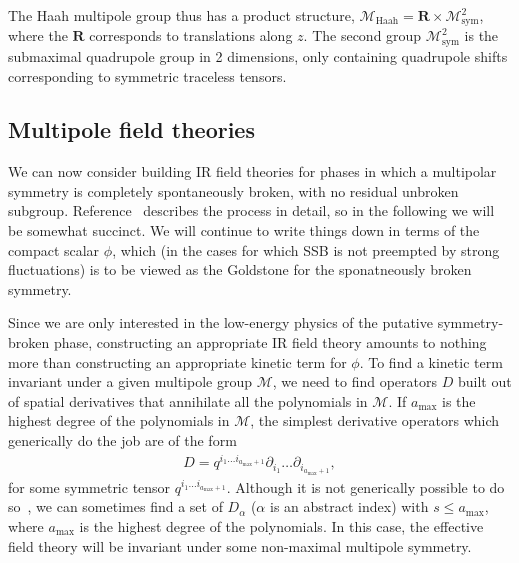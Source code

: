 \documentclass[pra,aps,twocolumn, amsfonts,amsmath,amssymb,nofootinbib,superscriptaddress]{revtex4-2}
\begin{document}
The Haah multipole group thus has a product structure, $\mathcal{M}_\text{Haah} = \mathbf{R} \times \mathcal{M}^2_\text{sym}$, where the $\mathbf{R}$ corresponds to translations along $z$. The second group $\mathcal{M}^2_\text{sym}$ is the submaximal quadrupole group in 2 dimensions, only containing quadrupole shifts corresponding to symmetric traceless tensors.

\subsection{Multipole field theories} \label{sub:field}

We can now consider building IR field theories for phases in which a multipolar symmetry is completely spontaneously broken, with no residual unbroken subgroup. Reference~\cite{Gromov2019} describes the process in detail, so in the following we will be somewhat succinct. 
We will continue to write things down in terms of the compact scalar $\phi$, which (in the cases for which SSB is not preempted by strong fluctuations) is to be viewed as the Goldstone for the sponatneously broken symmetry. 

Since we are only interested in the low-energy physics of the putative symmetry-broken phase, constructing an appropriate IR field theory amounts to nothing more than constructing an appropriate kinetic term for $\phi$. 
To find a kinetic term invariant under a given multipole group $\mathcal{M}$, we need to find operators $D$ built out of spatial derivatives that annihilate all the polynomials in $\mathcal{M}$. If $a_\text{max}$ is the highest degree of the polynomials in $\mathcal{M}$, the simplest derivative operators which generically do the job are of the form  
\begin{align}
D = q^{i_1\dots i_{a_\text{max}+1}}\partial_{i_1}\dots \partial_{i_{a_\text{max}+1}},
\end{align}
for some symmetric tensor $q^{i_1\dots i_{a_\text{max}+1}}$. Although it is not generically possible to do so~\cite{Gromov2019}, we can sometimes find a set of $D_\alpha$ ($\alpha$ is an abstract index) with $s\le a_{\text{max}}$, where $a_\text{max}$ is the highest degree of the polynomials. In this case, the effective field theory will be invariant under some non-maximal multipole symmetry.
\end{document}
